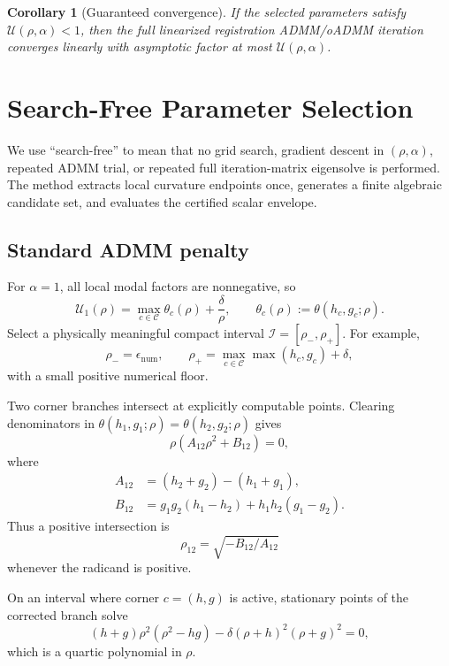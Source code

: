 \documentclass[11pt]{article}
\newtheorem{corollary}[theorem]{Corollary}
\theoremstyle{definition}
\begin{document}
\begin{corollary}[Guaranteed convergence]\label{cor:convergence}
If the selected parameters satisfy $\mathcal U(\rho,\alpha)<1$, then the full linearized registration ADMM/oADMM iteration converges linearly with asymptotic factor at most $\mathcal U(\rho,\alpha)$.
\end{corollary}

\section{Search-Free Parameter Selection}
We use ``search-free'' to mean that no grid search, gradient descent in $(\rho,\alpha)$, repeated ADMM trial, or repeated full iteration-matrix eigensolve is performed. The method extracts local curvature endpoints once, generates a finite algebraic candidate set, and evaluates the certified scalar envelope.

\subsection{Standard ADMM penalty}
For $\alpha=1$, all local modal factors are nonnegative, so
\begin{equation}
\mathcal U_{1}(\rho)
=\max_{c\in\mathcal C}\theta_c(\rho)+\frac{\delta}{\rho},
\qquad
\theta_c(\rho):=\theta(h_c,g_c;\rho).
\label{eq:standard_cert}
\end{equation}
Select a physically meaningful compact interval $\mathcal I=[\rho_-,\rho_+]$. For example,
\[
\rho_- = \epsilon_{\mathrm{num}},
\qquad
\rho_+=\max_{c\in\mathcal C}\max(h_c,g_c)+\delta,
\]
with a small positive numerical floor.

Two corner branches intersect at explicitly computable points. Clearing denominators in
$\theta(h_1,g_1;\rho)=\theta(h_2,g_2;\rho)$ gives
\begin{equation}
\rho\left(A_{12}\rho^2+B_{12}\right)=0,
\label{eq:intersection}
\end{equation}
where
\begin{align}
A_{12}&=(h_2+g_2)-(h_1+g_1),\\
B_{12}&=g_1g_2(h_1-h_2)+h_1h_2(g_1-g_2).
\end{align}
Thus a positive intersection is
\[
\rho_{12}=\sqrt{-B_{12}/A_{12}}
\]
whenever the radicand is positive.

On an interval where corner $c=(h,g)$ is active, stationary points of the corrected branch solve
\begin{equation}
(h+g)\rho^2(\rho^2-hg)
-\delta(\rho+h)^2(\rho+g)^2=0,
\label{eq:quartic}
\end{equation}
which is a quartic polynomial in $\rho$.
\end{document}
